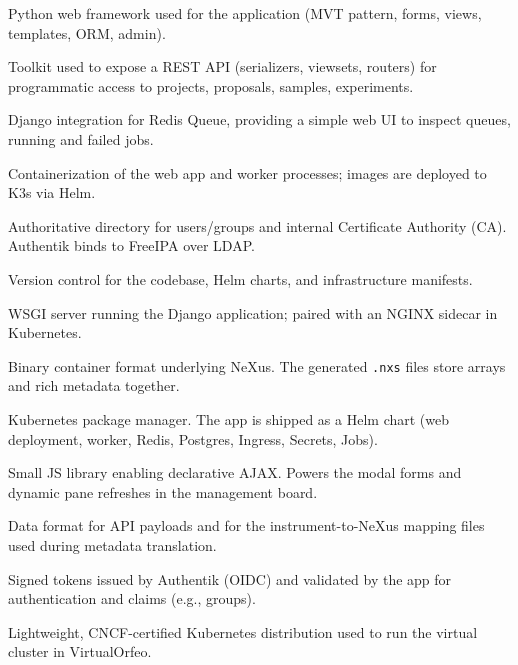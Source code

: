\begin{description}[style=nextline]
	\item[Django]
	Python web framework used for the application (MVT pattern, forms, views, templates, ORM, admin).
	
	\item[Django REST Framework (DRF)]
	Toolkit used to expose a REST API (serializers, viewsets, routers) for programmatic access to projects, proposals, samples, experiments.
	
	\item[django-rq]
	Django integration for Redis Queue, providing a simple web UI to inspect queues, running and failed jobs.
	
	\item[Docker]
	Containerization of the web app and worker processes; images are deployed to K3s via Helm.
	
	\item[FreeIPA]
	Authoritative directory for users/groups and internal Certificate Authority (CA). Authentik binds to FreeIPA over LDAP.
	
	\item[Git]
	Version control for the codebase, Helm charts, and infrastructure manifests.
	
	\item[Gunicorn]
	WSGI server running the Django application; paired with an NGINX sidecar in Kubernetes.
	
	\item[HDF5]
	Binary container format underlying NeXus. The generated \texttt{.nxs} files store arrays and rich metadata together.
	
	\item[Helm]
	Kubernetes package manager. The app is shipped as a Helm chart (web deployment, worker, Redis, Postgres, Ingress, Secrets, Jobs).
	
	\item[HTMX]
	Small JS library enabling declarative AJAX. Powers the modal forms and dynamic pane refreshes in the management board.
	
	\item[JSON]
	Data format for API payloads and for the instrument-to-NeXus mapping files used during metadata translation.
	
	\item[JWT (JSON Web Token)]
	Signed tokens issued by Authentik (OIDC) and validated by the app for authentication and claims (e.g., groups).
	
	\item[K3s]
	Lightweight, CNCF-certified Kubernetes distribution used to run the virtual cluster in VirtualOrfeo.
	

\end{description}

